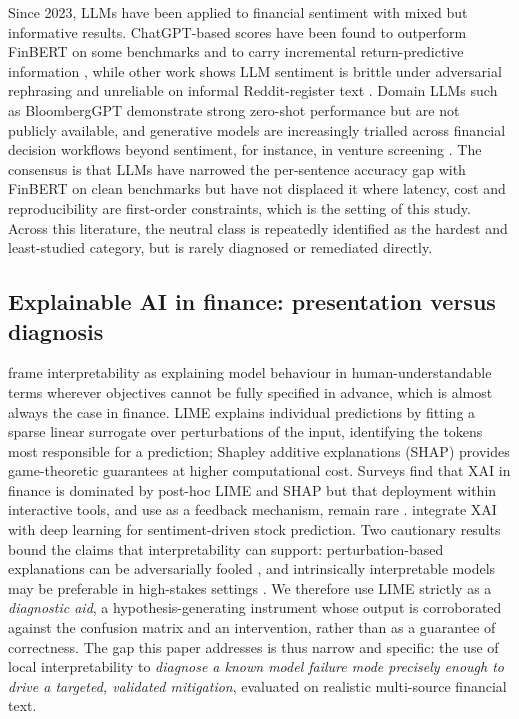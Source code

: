 \documentclass{aims}
\numberwithin{equation}{section}
\begin{document}
Since 2023, LLMs have been applied to financial sentiment
with mixed but informative results. ChatGPT-based scores have been found to
outperform FinBERT on some benchmarks and to carry incremental return-predictive
information \citep{fatouros2023,lopezlira2023}, while other work shows LLM sentiment
is brittle under adversarial rephrasing \citep{leippold2023} and unreliable on
informal Reddit-register text \citep{deng2023}. Domain LLMs such as BloombergGPT
\citep{wu2023} demonstrate strong zero-shot performance but are not publicly
available, and generative models are increasingly trialled across financial decision
workflows beyond sentiment, for instance, in venture screening \citep{vismara2026}. The consensus is that LLMs have narrowed the per-sentence accuracy gap
with FinBERT on clean benchmarks but have not displaced it where latency, cost and
reproducibility are first-order constraints, which is the setting of this study.
Across this literature, the neutral class is repeatedly identified as the hardest
and least-studied category, but is rarely diagnosed or remediated directly.

\subsection{Explainable AI in finance: presentation versus diagnosis}
\citet{doshivelez2017} frame interpretability as explaining model behaviour in
human-understandable terms wherever objectives cannot be fully specified in
advance, which is almost always the case in finance. LIME \citep{ribeiro2016}
explains individual predictions by fitting a sparse linear surrogate over
perturbations of the input, identifying the tokens most responsible for a
prediction; Shapley additive explanations (SHAP) \citep{lundberg2017} provides
game-theoretic guarantees at higher computational cost. Surveys find that XAI in finance is dominated by post-hoc LIME and SHAP but that deployment within interactive tools, and use as a feedback
mechanism, remain rare \citep{yeo2025}. \citet{sravankumar2025} integrate XAI with
deep learning for sentiment-driven stock prediction. Two cautionary
results bound the claims that interpretability can support: perturbation-based
explanations can be adversarially fooled \citep{slack2020}, and intrinsically
interpretable models may be preferable in high-stakes settings \citep{rudin2019}.
We therefore use LIME strictly as a \emph{diagnostic aid}, a hypothesis-generating
instrument whose output is corroborated against the confusion matrix and an
intervention, rather than as a guarantee of correctness. The gap this paper
addresses is thus narrow and specific: the use of local interpretability to
\emph{diagnose a known model failure mode precisely enough to drive a targeted,
validated mitigation}, evaluated on realistic multi-source financial text.
\end{document}
